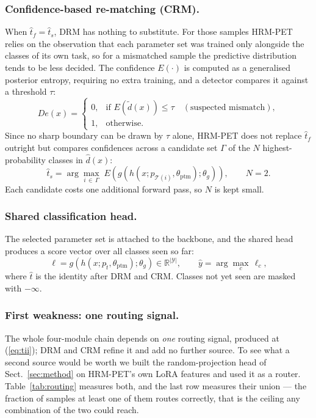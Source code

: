 \documentclass[runningheads]{llncs}
\begin{document}
\subsubsection{Confidence-based re-matching (CRM).}
When $\hat{t}_f = \hat{t}_s$, DRM has nothing to substitute. For those samples
HRM-PET relies on the observation that each parameter set was trained only
alongside the classes of its own task, so for a mismatched sample the predictive
distribution tends to be less decided. The confidence $E(\cdot)$ is computed as a
generalised posterior entropy, requiring no extra training, and a detector
compares it against a threshold $\tau$:
\begin{equation}
De(x) =
\begin{cases}
0, & \text{if } E(\tilde{d}(x)) \leq \tau \quad (\text{suspected mismatch}),\\
1, & \text{otherwise.}
\end{cases}
\label{eq:detect}
\end{equation}
Since no sharp boundary can be drawn by $\tau$ alone, HRM-PET does not replace
$\hat{t}_f$ outright but compares confidences across a candidate set $\Gamma$ of
the $N$ highest-probability classes in $\hat{d}(x)$:
\begin{equation}
\hat{t}_s = \arg\max_{i \,\in\, \Gamma}\;
   E\!\left(g\!\left(h(x; p_{\mathcal{T}(i)}, \theta_{\mathrm{ptm}});
   \theta_g\right)\right),
\qquad N = 2 .
\label{eq:crm}
\end{equation}
Each candidate costs one additional forward pass, so $N$ is kept small.

\subsubsection{Shared classification head.}
The selected parameter set is attached to the backbone, and the shared head
produces a score vector over all classes seen so far:
\begin{equation}
\ell = g\!\left(h(x; p_{\hat{t}}, \theta_{\mathrm{ptm}}); \theta_g\right)
   \in \mathbb{R}^{|\mathcal{Y}|},
\qquad
\hat{y} = \arg\max_c\, \ell_c ,
\label{eq:logits}
\end{equation}
where $\hat{t}$ is the identity after DRM and CRM. Classes not yet seen are
masked with $-\infty$.

\subsubsection{First weakness: one routing signal.}
The whole four-module chain depends on \emph{one} routing signal, produced at
(\ref{eq:tii}); DRM and CRM refine it and add no further source. To see what a
second source would be worth we built the random-projection head of
Sect.~\ref{sec:method} on HRM-PET's own LoRA features and used it as a router.
Table~\ref{tab:routing} measures both, and the last row measures their union ---
the fraction of samples at least one of them routes correctly, that is the
ceiling any combination of the two could reach.
\end{document}
